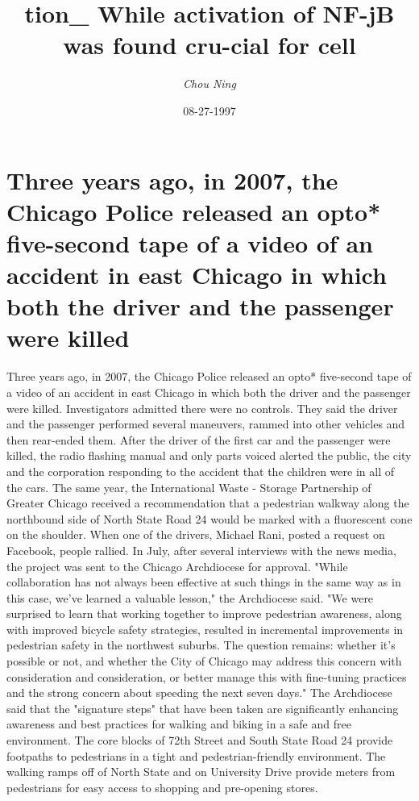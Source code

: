 \documentclass{article}%
\title{tion\_ While activation of NF{-}jB was found cru{-}cial for cell}%
\author{\textit{Chou Ning}}%
\date{08-27-1997}%
\begin{document}
%
\normalsize%
\maketitle%
\section{Three years ago, in 2007, the Chicago Police released an opto* five{-}second tape of a video of an accident in east Chicago in which both the driver and the passenger were killed}%
\label{sec:Threeyearsago,in2007,theChicagoPolicereleasedanopto*five{-}secondtapeofavideoofanaccidentineastChicagoinwhichboththedriverandthepassengerwerekilled}%
Three years ago, in 2007, the Chicago Police released an opto* five{-}second tape of a video of an accident in east Chicago in which both the driver and the passenger were killed. Investigators admitted there were no controls. They said the driver and the passenger performed several maneuvers, rammed into other vehicles and then rear{-}ended them.\newline%
After the driver of the first car and the passenger were killed, the radio flashing manual and only parts voiced alerted the public, the city and the corporation responding to the accident that the children were in all of the cars.\newline%
The same year, the International Waste {-} Storage Partnership of Greater Chicago received a recommendation that a pedestrian walkway along the northbound side of North State Road 24 would be marked with a fluorescent cone on the shoulder. When one of the drivers, Michael Rani, posted a request on Facebook, people rallied. In July, after several interviews with the news media, the project was sent to the Chicago Archdiocese for approval.\newline%
"While collaboration has not always been effective at such things in the same way as in this case, we've learned a valuable lesson," the Archdiocese said. "We were surprised to learn that working together to improve pedestrian awareness, along with improved bicycle safety strategies, resulted in incremental improvements in pedestrian safety in the northwest suburbs. The question remains: whether it's possible or not, and whether the City of Chicago may address this concern with consideration and consideration, or better manage this with fine{-}tuning practices and the strong concern about speeding the next seven days."\newline%
The Archdiocese said that the "signature steps" that have been taken are significantly enhancing awareness and best practices for walking and biking in a safe and free environment. The core blocks of 72th Street and South State Road 24 provide footpaths to pedestrians in a tight and pedestrian{-}friendly environment. The walking ramps off of North State and on University Drive provide meters from pedestrians for easy access to shopping and pre{-}opening stores.\newline%
\end{document}
